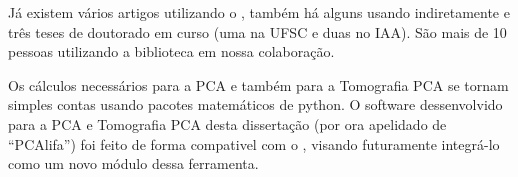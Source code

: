 Já existem vários artigos utilizando o \pycasso \citep{CidFernandes2013, CidFernandes2014, Perez2013,
GonzalezDelgado2014}, também há alguns usando indiretamente \citep{Husemann2013, IglesiasParamo2013} e três teses de
doutorado em curso (uma na UFSC e duas no IAA). São mais de 10 pessoas utilizando a biblioteca em nossa colaboração. 

Os cálculos necessários para a PCA e também para a Tomografia PCA se tornam simples contas usando pacotes matemáticos de
python. O software dessenvolvido para a PCA e Tomografia PCA desta dissertação (por ora apelidado de ``PCAlifa'') foi
feito de forma compativel com o \pycasso, visando futuramente integrá-lo como um novo módulo dessa ferramenta.

